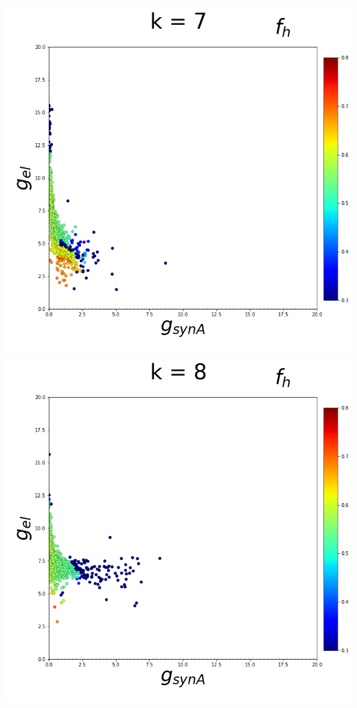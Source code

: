 \documentclass[11pt]{article}
\begin{document}
\begin{center}
\includegraphics[scale=0.125]{DSN_figs/STGCircuit_DSN_c=2_rs=4_k=7.png}
\includegraphics[scale=0.125]{DSN_figs/STGCircuit_DSN_c=2_rs=4_k=8.png}

\end{center}
\end{document}
